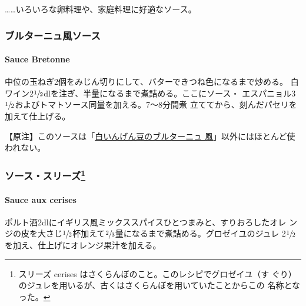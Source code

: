 \documentclass[twoside,12Q,b5j]{escoffierltjsbook}
\renewcommand{\ldots}{…}
\newenvironment{recette}{\begin{small}\begin{spacing}{1}\begin{multicols}{2}}{\end{multicols}\end{spacing}\end{small}}
\begin{document}
\begin{recette}
\ldots{}\ldots{}いろいろな卵料理や、家庭料理に好適なソース。

\vspace*{1.7\zw}

\subsubsection{ブルターニュ風ソース}\label{ux30d6ux30ebux30bfux30fcux30cbux30e5ux98a8ux30bdux30fcux30b9}

\paragraph{Sauce Bretonne}\label{sauce-bretonne}


中位の玉ねぎ2個をみじん切りにして、バターできつね色になるまで炒める。
白ワイン2\(\sfrac{1}{2}\)dlを注ぎ、半量になるまで煮詰める。ここにソース・
エスパニョル3\(\sfrac{1}{2}\)およびトマトソース同量を加える。7〜8分間煮
立ててから、刻んだパセリを加えて仕上げる。

【原注】このソースは「\protect\hyperlink{haricots-blancs-a-la-bretonne}{白いんげん豆のブルターニュ
風}」以外にはほとんど使われない。

\vspace*{1.7\zw}

\subsubsection[ソース・スリーズ]{\texorpdfstring{ソース・スリーズ\footnote{スリーズ
  cerises はさくらんぼのこと。このレシピでグロゼイユ（す
  ぐり）のジュレを用いるが、古くはさくらんぼを用いていたことからこの
  名称となった。}}{ソース・スリーズ}}\label{ux30bdux30fcux30b9ux30b9ux30eaux30fcux30ba6}

\paragraph{Sauce aux cerises}\label{sauce-aux-cerises}


ポルト酒2dlにイギリス風ミックススパイスひとつまみと、すりおろしたオレ
ンジの皮を大さじ\(\sfrac{1}{2}\)杯加えて\(\sfrac{2}{3}\)量になるまで煮詰める。グロゼイユのジュレ
2\(\sfrac{1}{2}\)を加え、仕上げにオレンジ果汁を加える。


\end{recette}
\end{document}
